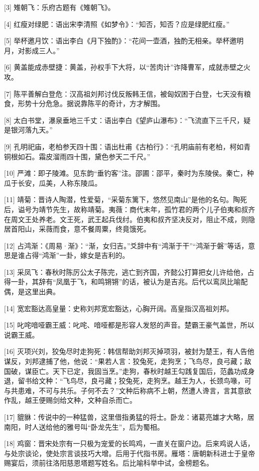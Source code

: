 \documentclass[12pt,UTF8]{ctexbook}
\begin{document}
[3] 雉朝飞：乐府古题有《雉朝飞》。

[4] 红瘦对绿肥：语出宋李清照《如梦令》：“知否，知否？应是绿肥红瘦。”

[5] 举杯邀月饮：语出李白《月下独酌》：“花间一壶酒，独酌无相亲。举杯邀明月，对影成三人。”

[6] 黄盖能成赤壁捷：黄盖，孙权手下大将，以“苦肉计”诈降曹军，成就赤壁之火攻。

[7] 陈平善解白登危：汉高祖刘邦讨伐反叛韩王信，被匈奴困于白登，七天没有粮食，形势十分危急。据说靠陈平的奇计，方才解围。

[8] 太白书堂，瀑泉垂地三千丈：语出李白《望庐山瀑布》：“飞流直下三千尺，疑是银河落九天。”

[9] 孔明祀庙，老柏参天四十围：语出杜甫《古柏行》：“孔明庙前有老柏，柯如青铜根如石。霜皮溜雨四十围，黛色参天二千尺。”

[10] 严滩：即子陵滩。见东韵“垂钓客”注。邵圃：邵平，秦时为东陵侯。秦亡，种瓜于长安，瓜美，人称东陵瓜。

[11] 靖菊：晋诗人陶潜，性爱菊，“采菊东篱下，悠然见南山”是他的名句。陶死后，谥号为靖节先生，故称靖菊。夷薇：商代末年，孤竹君的两个儿子伯夷和叔齐在周文王处养老。文王死，武王起兵伐纣。伯夷和叔齐坚决反对，阻止不成，则隐居首阳山，采薇而食，意不餐周粟，终竟饿死。

[12] 占鸿渐：《周易·渐》：“渐，女归吉。”爻辞中有“鸿渐于干”“鸿渐于磐”等话，意思是谁占得“鸿渐”一卦，嫁女是吉利的。

[13] 采凤飞：春秋时陈厉公太子陈完，逃亡到齐国，齐懿公打算把女儿许给他，占得一卦，其辞有“凤凰于飞，和鸣锵锵”的话，被认为是吉兆。后代以鸾凤比喻配偶，是这里出典。

[14] 宽宏豁达高皇量：史称刘邦宽宏豁达，心胸开阔。高皇指汉高祖刘邦。

[15] 叱咤喑哑霸王威：叱咤、喑哑都是形容人发怒的声音。楚霸王豪气盖世，所以说霸王威。

[16] 灭项兴刘，狡兔尽时走狗死：韩信帮助刘邦灭掉项羽，被封为楚王，有人告他谋反，刘邦逮捕了他，他说：“果若人言：狡兔死，走狗烹；飞鸟尽，良弓藏；敌国破，谋臣亡。天下已定，我固当烹。”走狗，春秋时越王勾践复国后，范蠡功成身退，留书给文种：“飞鸟尽，良弓藏；狡兔死，走狗烹。越王为人，长颈鸟喙，可与共患难，不可与共乐。子何不去？”文种后称病不上朝，然遭人谗言，言其意欲作乱，越王便赐剑给文种，文种自杀而亡。

[17] 貔貅：传说中的一种猛兽，这里借指勇猛的将士。卧龙：诸葛亮雄才大略，居南阳，时人送给他的雅号叫“卧龙先生”，后为蜀相。

[18] 鸡窗：晋宋处宗有一只极为宠爱的长鸣鸡，一直关在窗户边。后来鸡说人话，与处宗谈论，使处宗言谈技巧大增。后用于代指书房。雁塔：唐朝新科进士于皇帝赐宴后，须前往洛阳慈恩塔题写姓名。后比喻科举中试，金榜题名。
\end{document}

